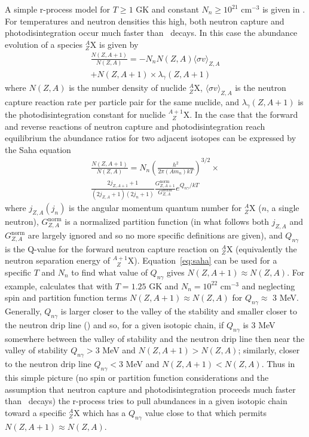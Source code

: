 A simple r-process model for $T\geq 1$ GK and constant $N_n \geq 10^{21}$
cm$^{-3}$ is given in \cite{iliadis2008}.  For temperatures and
neutron densities this high, both neutron capture and
photodisintegration occur much faster than \bminus\ decays.  In this
case the abundance evolution of a species $^A_Z$X is given by
\begin{multline}
\frac{N(Z,A+1)}{N(Z,A)} = - N_nN(Z,A) \langle \sigma v \rangle_{Z,A} \\
+N(Z,A+1)\times\lambda_\gamma (Z,A+1)
\end{multline}
where $N(Z,A)$ is the number density of  nuclide $^A_Z$X, $\langle 
\sigma v \rangle_{Z,A}$ is the neutron
capture reaction rate per particle pair for the same nuclide, and
$\lambda_\gamma (Z,A+1)$ is the photodisintegration constant for
nuclide  $^{A+1}_{\ \ \ Z}$X. 
In the case that the forward and reverse
reactions of neutron capture and photodisintegration reach equilibrium
the abundance ratios for two adjacent isotopes can be expressed by the
Saha equation
\begin{multline}
\label{eq:saha}
\frac{N(Z,A+1)}{N(Z,A)} =N_n\left(\frac{h^2}{2\pi
(Am_{n})kT}\right)^{3/2} \times \\
\frac{2j_{Z,A+1}+1}{(2j_{Z,A}+1)(2j_{n}+1)}
\frac{G^{\textrm{norm}}_{Z,A+1}}{G^{\textrm{norm}}_{Z,A}}e^{Q_{n\gamma}/kT}
\end{multline}
where $j_{Z,A} (j_n)$ is the angular momentum quantum number for
$^{A}_{Z}$X ($n$, a single neutron), $G^{\textrm{norm}}_{Z,A}$ is a normalized partition
function (in what follows both $j_{Z,A}$ and
$G^{\textrm{norm}}_{Z,A}$ are largely ignored and so no more specific
definitions are given), and $Q_{n\gamma}$ is the Q-value for the forward 
neutron capture
reaction on $^{A}_{Z}$X (equivalently the neutron separation energy of
$^{A+1}_{\ \ \ Z}$X). Equation~\ref{eq:saha} can be used 
for a specific $T$ and $N_n$ to find what value of 
$Q_{n\gamma}$  gives $N(Z,A+1) \approx N(Z,A)$.
For example, \cite{iliadis2008} calculates that with $T=1.25$ GK and 
$N_n=10^{22}$ cm$^{-3}$ and neglecting spin and partition function terms
$N(Z,A+1) \approx N(Z,A)$ for $Q_{n\gamma}\approx$ 3 MeV.  Generally,
$Q_{n\gamma}$ is larger closer to the valley of the stability and
smaller closer to the neutron drip line (\citealt{iliadis2008}) and
so, for a given isotopic chain, if $Q_{n\gamma}$ is 3 MeV somewhere
between the valley of stability and the neutron drip line then near the valley of stability $Q_{n\gamma}> 3$  MeV and $N(Z,A+1) >
N(Z,A)$; similarly, closer to the neutron drip line $Q_{n\gamma}< 3$
MeV and $N(Z,A+1) < N(Z,A)$.  Thus in this simple picture (no spin or
partition function considerations and the assumption  that neutron capture and
photodisintegration proceeds much faster than \bminus\ decays)
the r-process  tries to pull abundances in a
given isotopic chain toward a specific $^A_Z$X which has a
$Q_{n\gamma}$ value close to that which permits $N(Z,A+1) \approx N(Z,A)$. 

